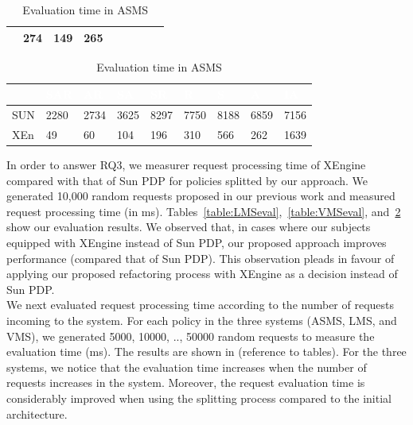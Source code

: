 \begin{table}[t]
\begin{tabular}{|l|l|l|l|l|l|l|l|l|}
& \scriptsize {274}
& \scriptsize {149}
& \scriptsize {265}
  \\ \hline
\end{tabular}

\caption{Evaluation time in VMS}
\label{table:VMSeval}
\vspace{5 mm}
%
\centering
\begin{tabular}{|l|l|l|l|l|l|l|l|l|}   
\hline  \rowcolor{black} \scriptsize \bf \textcolor {white}{}
& \scriptsize \bf \textcolor {white}{SAR}
& \scriptsize \bf \textcolor {white}{AR}
& \scriptsize \bf \textcolor  {white}{SA}
& \scriptsize \bf \textcolor  {white}{SR}
& \scriptsize \bf \textcolor  {white}{R}

& \scriptsize \bf \textcolor  {white}{S} 
& \scriptsize \bf \textcolor  {white}{A}
& \scriptsize \bf \textcolor {white}{IA}\\ \hline
\scriptsize  {SUN }
& \scriptsize  {2280}
& \scriptsize {2734}
& \scriptsize {3625}
& \scriptsize {8297}
& \scriptsize {7750}

& \scriptsize {8188}
& \scriptsize {6859}
& \scriptsize {7156}
  \\ \hline
\scriptsize  {XEn}
& \scriptsize  {49}
& \scriptsize {60}
& \scriptsize {104}
& \scriptsize {196}
& \scriptsize {310}

& \scriptsize {566}
& \scriptsize {262}
& \scriptsize {1639}
  \\ \hline
\end{tabular}

\caption{Evaluation time in ASMS}
\label{table:ASMSeval}
\end{table}

In order to answer RQ3, we measurer request processing time of XEngine compared with that of Sun PDP
for policies splitted by our approach.
We generated 10,000 random requests proposed in our previous work \cite{request} and measured request processing time (in ms).
Tables~\ref{table:LMSeval},~\ref{table:VMSeval}, and~\ref{table:ASMSeval} show our evaluation results.
We observed that, in cases where our subjects equipped with XEngine instead of Sun PDP, our proposed approach 
improves performance (compared that of Sun PDP). This observation pleads in favour of applying our proposed refactoring process with XEngine as a decision instead of Sun PDP.\\

We next evaluated request processing time according to the number of requests incoming to the system. 
For each policy in the three systems (ASMS, LMS, and VMS), we generated 5000, 10000, .., 50000 random requests to measure the evaluation time (ms).
The results are shown in (reference to tables). For the three systems, we notice that the evaluation time increases when the number of requests increases in the system. 
Moreover, the request evaluation time is considerably improved when using the splitting process compared to the initial architecture.

